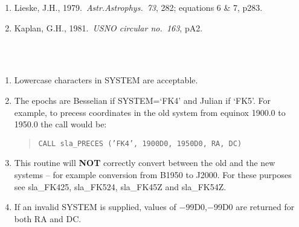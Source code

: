 {
 \begin{enumerate}
  \item Lieske, J.H., 1979.\ {\it Astr.Astrophys.}\ {\it 73}, 282;
        equations 6 \& 7, p283.
  \item Kaplan, G.H., 1981.\ {\it USNO circular no.\ 163}, pA2.
 \end{enumerate}
}
{
}
{
  \\
  \\
}
{
}
\notes
{
 \begin{enumerate}
  \item Lowercase characters in SYSTEM are acceptable.
  \item The epochs are Besselian if SYSTEM=`FK4' and Julian if `FK5'.
        For example, to precess coordinates in the old system from
        equinox 1900.0 to 1950.0 the call would be:
        \begin{quote}
         {\tt CALL sla\_PRECES ('FK4', 1900D0, 1950D0, RA, DC)}
        \end{quote}
  \item This routine will {\bf NOT} correctly convert between the old and
        the new systems -- for example conversion from B1950 to J2000.
        For these purposes see sla\_FK425, sla\_FK524, sla\_FK45Z and
        sla\_FK54Z.
  \item If an invalid SYSTEM is supplied, values of $-$99D0,$-$99D0 are
        returned for both RA and DC.
 \end{enumerate}
}
{
}
{
  \\
}
{
}
